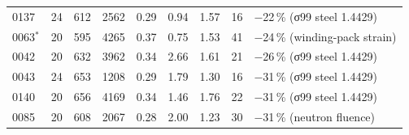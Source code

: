 \begin{tabular}{@{}lrrrrrrrl@{}}
0137 & 24 & \num{612} & \num{2562} & \num{0.29} & \num{0.94} & \num{1.57} & \num{16} & \num{-22}\,\% (σ99 steel 1.4429) \\
0063$^\ast$ & 20 & \num{595} & \num{4265} & \num{0.37} & \num{0.75} & \num{1.53} & \num{41} & \num{-24}\,\% (winding-pack strain) \\
0042 & 20 & \num{632} & \num{3962} & \num{0.34} & \num{2.66} & \num{1.61} & \num{21} & \num{-26}\,\% (σ99 steel 1.4429) \\
0043 & 24 & \num{653} & \num{1208} & \num{0.29} & \num{1.79} & \num{1.30} & \num{16} & \num{-31}\,\% (σ99 steel 1.4429) \\
0140 & 20 & \num{656} & \num{4169} & \num{0.34} & \num{1.46} & \num{1.76} & \num{22} & \num{-31}\,\% (σ99 steel 1.4429) \\
0085 & 20 & \num{608} & \num{2067} & \num{0.28} & \num{2.00} & \num{1.23} & \num{30} & \num{-31}\,\% (neutron fluence) \\
\bottomrule\end{tabular}
